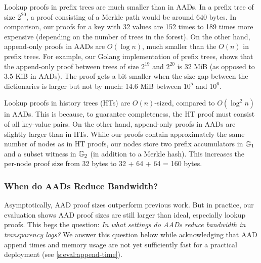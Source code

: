 Lookup proofs in prefix trees are much smaller than in AADs.
In a prefix tree of size $2^{20}$, a proof consisting of a Merkle path would be around $640$ bytes.
In comparison, our proofs for a key with 32 values are 152 times to 189 times more expensive (depending on the number of trees in the forest).
On the other hand, append-only proofs in AADs are $O(\log{n})$, much smaller than the $O(n)$ in prefix trees.
For example, our Golang implementation of prefix trees, shows that the append-only proof between trees of size $2^{19}$ and $2^{20}$ is 32 MiB (as opposed to 3.5 KiB in AADs).
The proof gets a bit smaller when the size gap between the dictionaries is larger but not by much: 14.6 MiB between $10^5$ and $10^6$.

Lookup proofs in history trees (HTs) are $O(n)$-sized, compared to $O(\log^2{n})$ in AADs.
This is because, to guarantee completeness, the HT proof must consist of all key-value pairs.
On the other hand, append-only proofs in AADs are slightly larger than in HTs.
While our proofs contain approximately the same number of nodes as in HT proofs, our nodes store two prefix accumulators in $\mathbb{G}_1$ and a subset witness in $\mathbb{G}_2$ (in addition to a Merkle hash).
This increases the per-node proof size from 32 bytes to 32 + 64 + 64 = 160 bytes.




\subsubsection{When do AADs Reduce Bandwidth?}
\label{s:eval:worth-it}
Asymptotically, AAD proof sizes outperform previous work.
But in practice, our evaluation shows AAD proof sizes are still larger than ideal, especially lookup proofs.
This begs the question: \textit{In what settings do AADs reduce bandwidth in transparency logs?}
We answer this question below while acknowledging that AAD append times and memory usage are not yet sufficiently fast for a practical deployment (see \cref{s:eval:append-time}).

